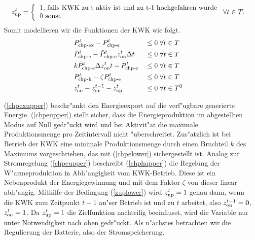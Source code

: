 \begin{align*}
\zup = \left \{
\begin{tabular}{l}
1, \text{falls KWK zu t aktiv ist und zu} t-1 \text{hochgefahren wurde}\\
0 \text{sonst} 
\end{tabular} \right.
\forall t \in T \text{.}
\end{align*}
Somit modellieren wir die Funktionen der KWK wie folgt.
\begin{align}
& P^t_{\text{chp-ex}} - P^t_{\text{chp-e}} &&\leq 0 \; \forall t \in T \label{chpexupper}\\
& P^t_{\text{chp-e}} - \bar P^t_{\text{chp-e}} z^t_{\text{on}} \Delta t &&\leq 0 \; \forall t \in T \label{chpeupper}\\
& k \bar P^t_{\text{chp-e}} \Delta z^t_{\text{on}} t - P^t_{\text{chp-e}} &&\leq 0 \; \forall t \in T \label{chpelower}\\
& P^t_{\text{chp-h}} - \zeta P^t_{\text{chp-e}} &&\leq 0 \; \forall t \in T \label{chphupper} \\
& z^t_{\text{on}} - z^{t-1}_{\text{on}} - z^t_{\text{up}} &&\leq 0 \; \forall t \in T^0 \label{zuplower} \\
\end{align}

(\ref{chpexupper}) beschr"ankt den Energieexport auf die verf"ugbare generierte Energie. (\ref{chpeupper}) stellt sicher, dass die Energieproduktion im abgestellten Modus auf Null gedr"uckt wird und bei Aktivit"at die maximale Produktionsmenge pro Zeitintervall nicht "uberschreitet. Zus"atzlich ist bei Betrieb der KWK eine minimale Produktionsmenge durch einen Bruchteil $k$ des Maximums vorgeschrieben, das mit (\ref{chpelower}) sichergestellt ist. Analog zur Stromregelung (\ref{chpeupper}) beschreibt (\ref{chphupper}) die Regelung der W"armeproduktion in Abh"angigkeit vom KWK-Betrieb. Diese ist ein Nebenprodukt der Energiegewinnung und mit dem Faktor $\zeta$ von dieser linear abh"angig. Mithilfe der Bedingung (\ref{zuplower}) wird $z^t_{\text{up}} = 1$ genau dann, wenn die KWK zum Zeitpunkt $t-1$ au"ser Betrieb ist und zu $t$ arbeitet, also $z^{t-1}_{\text{on}} = 0$, $z^t_{\text{on}} = 1$. Da $z^t_{\text{up}}=1$ die Zielfunktion nachteilig beeinflusst, wird die Variable nur unter Notwendigkeit nach oben gedr"uckt. Als n"achstes betrachten wir die Regulierung der Batterie, also der Stromspeicherung.



